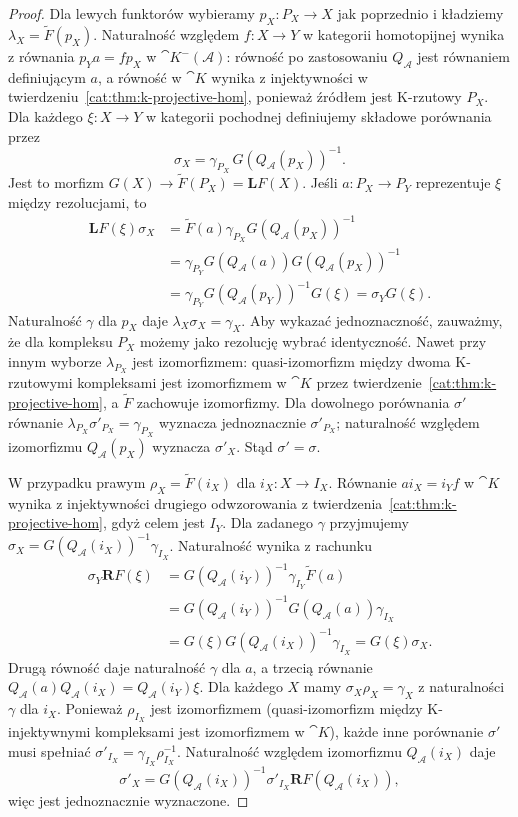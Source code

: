 \begin{proof}
Dla lewych funktorów wybieramy $p_X:P_X\to X$ jak poprzednio i kładziemy $\lambda_X=\widetilde F(p_X)$. Naturalność względem $f:X\to Y$ w kategorii homotopijnej wynika z równania $p_Ya=fp_X$ w $\cat K^-(\mathcal A)$: równość po zastosowaniu $Q_{\mathcal A}$ jest równaniem definiującym $a$, a równość w $\cat K$ wynika z injektywności w twierdzeniu~\ref{cat:thm:k-projective-hom}, ponieważ źródłem jest K-rzutowy $P_X$. Dla każdego $\xi:X\to Y$ w kategorii pochodnej definiujemy składowe porównania przez
\[
 \sigma_X=\gamma_{P_X}\,G(Q_{\mathcal A}(p_X))^{-1}.
\]
Jest to morfizm $G(X)\to \widetilde F(P_X)=\mathbf L F(X)$. Jeśli $a:P_X\to P_Y$ reprezentuje $\xi$ między rezolucjami, to
\[
\begin{aligned}
 \mathbf L F(\xi)\sigma_X
 &=\widetilde F(a)\gamma_{P_X}G(Q_{\mathcal A}(p_X))^{-1}\\
 &=\gamma_{P_Y}G(Q_{\mathcal A}(a))G(Q_{\mathcal A}(p_X))^{-1}\\
 &=\gamma_{P_Y}G(Q_{\mathcal A}(p_Y))^{-1}G(\xi)
 =\sigma_YG(\xi).
\end{aligned}
\]
Naturalność $\gamma$ dla $p_X$ daje $\lambda_X\sigma_X=\gamma_X$. Aby wykazać jednoznaczność, zauważmy, że dla kompleksu $P_X$ możemy jako rezolucję wybrać identyczność. Nawet przy innym wyborze $\lambda_{P_X}$ jest izomorfizmem: quasi-izomorfizm między dwoma K-rzutowymi kompleksami jest izomorfizmem w $\cat K$ przez twierdzenie~\ref{cat:thm:k-projective-hom}, a $\widetilde F$ zachowuje izomorfizmy. Dla dowolnego porównania $\sigma'$ równanie $\lambda_{P_X}\sigma'_{P_X}=\gamma_{P_X}$ wyznacza jednoznacznie $\sigma'_{P_X}$; naturalność względem izomorfizmu $Q_{\mathcal A}(p_X)$ wyznacza $\sigma'_X$. Stąd $\sigma'=\sigma$.

W przypadku prawym $\rho_X=\widetilde F(i_X)$ dla $i_X:X\to I_X$. Równanie $ai_X=i_Yf$ w $\cat K$ wynika z injektywności drugiego odwzorowania z twierdzenia~\ref{cat:thm:k-projective-hom}, gdyż celem jest $I_Y$. Dla zadanego $\gamma$ przyjmujemy $\sigma_X=G(Q_{\mathcal A}(i_X))^{-1}\gamma_{I_X}$. Naturalność wynika z rachunku
\[
\begin{aligned}
 \sigma_Y\mathbf R F(\xi)
 &=G(Q_{\mathcal A}(i_Y))^{-1}\gamma_{I_Y}\widetilde F(a)\\
 &=G(Q_{\mathcal A}(i_Y))^{-1}G(Q_{\mathcal A}(a))\gamma_{I_X}\\
 &=G(\xi)G(Q_{\mathcal A}(i_X))^{-1}\gamma_{I_X}
 =G(\xi)\sigma_X.
\end{aligned}
\]
Drugą równość daje naturalność $\gamma$ dla $a$, a trzecią równanie $Q_{\mathcal A}(a)Q_{\mathcal A}(i_X)=Q_{\mathcal A}(i_Y)\xi$. Dla każdego $X$ mamy $\sigma_X\rho_X=\gamma_X$ z naturalności $\gamma$ dla $i_X$. Ponieważ $\rho_{I_X}$ jest izomorfizmem (quasi-izomorfizm między K-injektywnymi kompleksami jest izomorfizmem w $\cat K$), każde inne porównanie $\sigma'$ musi spełniać $\sigma'_{I_X}=\gamma_{I_X}\rho_{I_X}^{-1}$. Naturalność względem izomorfizmu $Q_{\mathcal A}(i_X)$ daje
\[
 \sigma'_X=G(Q_{\mathcal A}(i_X))^{-1}\sigma'_{I_X}\mathbf R F(Q_{\mathcal A}(i_X)),
\]
więc jest jednoznacznie wyznaczone.
\end{proof}
